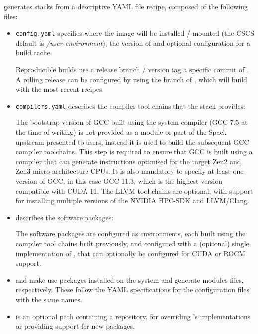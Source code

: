 \stackinator generates stacks from a descriptive YAML file recipe, composed of the following files:
\begin{itemize}
    \item  \lstinline{config.yaml} specifies where the image will be installed / mounted (the CSCS default is \emph{/user-environment}), the version of \spack and optional configuration for a \spack build cache. 
        
        Reproducible builds use a release branch / version tag a specific commit of \spack. A rolling release can be configured by using the  branch of \spack, which will build with the most recent \spack recipes.

    \item \lstinline{compilers.yaml} describes the compiler tool chains that the stack provides:
        
        The bootstrap version of GCC built using the system compiler (GCC 7.5 at the time of writing) is not provided as a module or part of the Spack upstream presented to users, instead it is used to build the subsequent GCC compiler toolchains.
        This step is required to ensure that GCC is built using a compiler that can generate instructions optimised for the target Zen2 and Zen3 micro-architecture CPUs.
        It is also mandatory to specify at least one version of GCC, in this case GCC 11.3, which is the highest version compatible with CUDA 11.
        The LLVM tool chains are optional, with support for installing multiple versions of the NVIDIA HPC-SDK and LLVM/Clang.

    \item {} describes the software packages:
        
        The software packages are configured as environments, each built using the compiler tool chains built previously, and configured with a (optional) single implementation of \craympich, that can optionally be configured for CUDA or ROCM support.

    \item {} and  make \spack use packages installed on the system and generate modules files, respectively.
        These follow the YAML specifications for the \spack configuration files with the same names.

    \item {} is an optional path containing a \href{https://spack.readthedocs.io/en/latest/repositories.html}{\spack repository}, for overriding \spack's implementations or providing support for new packages.

\end{itemize}


